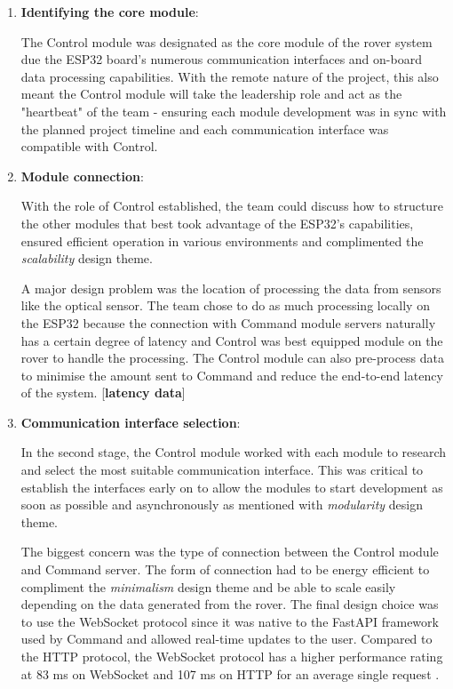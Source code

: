 \documentclass[11pt, a4paper]{article}
\begin{document}
\begin{enumerate}

    \item \textbf{Identifying the core module}: 
    
    The Control module was designated as the core module of the rover system due the ESP32 board's numerous communication interfaces and on-board data processing capabilities. With the remote nature of the project, this also meant the Control module will take the leadership role and act as the "heartbeat" of the team - ensuring each module development was in sync with the planned project timeline and each communication interface was compatible with Control.   

    \item \textbf{Module connection}:
    
    With the role of Control established, the team could discuss how to structure the other modules that best took advantage of the ESP32's capabilities, ensured efficient operation in various environments and complimented the \textit{scalability} design theme. 

    A major design problem was the location of processing the data from sensors like the optical sensor. The team chose to do as much processing locally on the ESP32 because the connection with Command module servers naturally has a certain degree of latency and Control was best equipped module on the rover to handle the processing. The Control module can also pre-process data to minimise the amount sent to Command and reduce the end-to-end latency of the system. [\textbf{latency data}]
    
    \item \textbf{Communication interface selection}: 
    
    In the second stage, the Control module worked with each module to research and select the most suitable communication interface. This was critical to establish the interfaces early on to allow the modules to start development as soon as possible and asynchronously as mentioned with \textit{modularity} design theme. 

    The biggest concern was the type of connection between the Control module and Command server. The form of connection had to be energy efficient to compliment the \textit{minimalism} design theme and be able to scale easily depending on the data generated from the rover. The final design choice was to use the WebSocket protocol since it was native to the FastAPI framework used by Command and allowed real-time updates to the user. Compared to the HTTP protocol, the WebSocket protocol has a higher performance rating at 83 ms on WebSocket and 107 ms on HTTP for an average single request \cite{SocketvsHTTP}.  

\end{enumerate}  
\end{document}
